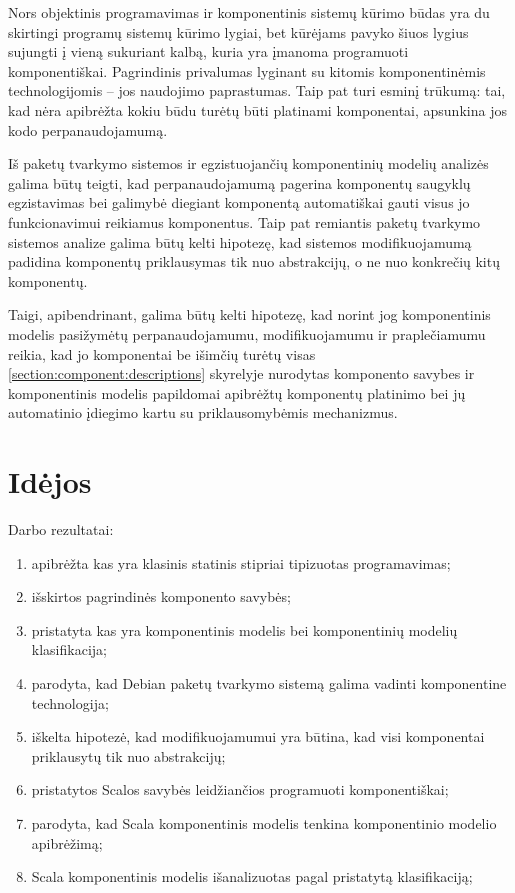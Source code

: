 

Nors objektinis programavimas ir komponentinis sistemų kūrimo būdas
yra du skirtingi programų sistemų kūrimo lygiai, bet
 kūrėjams pavyko šiuos lygius sujungti į vieną
sukuriant kalbą, kuria yra įmanoma programuoti komponentiškai.
Pagrindinis  privalumas lyginant su kitomis
komponentinėmis technologijomis – jos naudojimo paprastumas. Taip pat
 turi esminį trūkumą: tai, kad nėra apibrėžta
kokiu būdu turėtų būti platinami  komponentai,
apsunkina jos kodo perpanaudojamumą.

Iš  paketų tvarkymo sistemos ir egzistuojančių
komponentinių modelių analizės galima būtų teigti, kad
perpanaudojamumą pagerina komponentų saugyklų egzistavimas bei galimybė
diegiant komponentą automatiškai gauti visus jo funkcionavimui
reikiamus komponentus. Taip pat remiantis  paketų
tvarkymo sistemos analize galima būtų kelti hipotezę, kad
sistemos modifikuojamumą padidina komponentų priklausymas tik nuo
abstrakcijų, o ne nuo konkrečių kitų komponentų.

Taigi, apibendrinant, galima būtų kelti hipotezę, kad norint jog
komponentinis modelis pasižymėtų perpanaudojamumu, modifikuojamumu ir
praplečiamumu reikia, kad jo komponentai be išimčių turėtų visas
\ref{section:component:descriptions} skyrelyje nurodytas komponento
savybes ir komponentinis modelis papildomai apibrėžtų komponentų
platinimo bei jų automatinio įdiegimo kartu su priklausomybėmis
mechanizmus.

\section{Idėjos}

Darbo rezultatai:
\begin{enumerate}
  \item apibrėžta kas yra klasinis statinis stipriai tipizuotas
    programavimas;
  \item išskirtos pagrindinės komponento savybės;
  \item pristatyta kas yra komponentinis modelis bei komponentinių
    modelių klasifikacija;
  \item parodyta, kad Debian paketų tvarkymo sistemą galima vadinti
    komponentine technologija;
  \item iškelta hipotezė, kad modifikuojamumui yra būtina, kad
    visi komponentai priklausytų tik nuo abstrakcijų;
  \item pristatytos Scalos savybės leidžiančios programuoti
    komponentiškai;
  \item parodyta, kad Scala komponentinis modelis tenkina komponentinio
    modelio apibrėžimą;
  \item Scala komponentinis modelis išanalizuotas pagal pristatytą
    klasifikaciją;
\end{enumerate}

